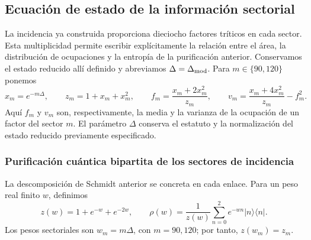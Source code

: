 \subsection{Ecuación de estado de la información sectorial}
\label{ii:sec:ii-ecuacion-informacion}

La incidencia ya construida proporciona dieciocho factores tríticos en
cada sector. Esta multiplicidad permite escribir explícitamente la
relación entre el área, la distribución de ocupaciones y la entropía de
la purificación anterior. Conservamos el estado reducido allí definido
y abreviamos $\Delta=\Delta_{\rm mod}$. Para $m\in\{90,120\}$ ponemos
\begin{equation}
 x_m=e^{-m\Delta},\qquad z_m=1+x_m+x_m^2,\qquad
 f_m=\frac{x_m+2x_m^2}{z_m},\qquad
 v_m=\frac{x_m+4x_m^2}{z_m}-f_m^2.
 \label{ii:eq:ii-sector-momentos}
\end{equation}
Aquí $f_m$ y $v_m$ son, respectivamente, la media y la varianza de
la ocupación de un factor del sector $m$. El parámetro $\Delta$ conserva
el estatuto y la normalización del estado reducido previamente
especificado.

\subsubsection{Purificación cuántica bipartita de los sectores de incidencia}
\label{ii:sec:ii-area-purificacion-producto}

La descomposición de Schmidt anterior se concreta en cada enlace.
Para un peso real finito \(w\), definimos
\[
 z(w)=1+e^{-w}+e^{-2w},\qquad
 \rho(w)=\frac1{z(w)}\sum_{n=0}^2e^{-wn}|n\rangle\langle n|.
\]
Los pesos sectoriales son \(w_m=m\Delta\), con \(m=90,120\);
por tanto, \(z(w_m)=z_m\).

